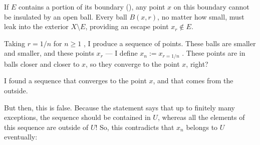 \begin{proofWrapper}
\begin{content}
\begin{center}
\end{center}

\begin{steps}
If $E$ contains a portion of its boundary (), any point $x$ on this boundary cannot be insulated by an open ball. Every ball $B(x, r)$, no matter how small, must leak into the exterior $X \setminus E$, providing an escape point $x_r \notin E$.
\end{steps}
\end{content}

\begin{speech}[00:50:46 - 00:52:28]
Taking $r = 1/n$ for $n \ge 1$ , I produce a sequence of points. These balls are smaller and smaller, and these points $x_r$ --- I define $x_n := x_{r=1/n}$ . These points are in balls closer and closer to $x$, so they converge to the point $x$, right? 

I found a sequence that converges to the point $x$, and that comes from the outside.

But then, this is false. Because the statement says that up to finitely many exceptions, the sequence should be contained in $U$, whereas all the elements of this sequence are outside of $U$! So, this contradicts that $x_n$ belongs to $U$ eventually: 


\end{speech}
\end{proofWrapper}

